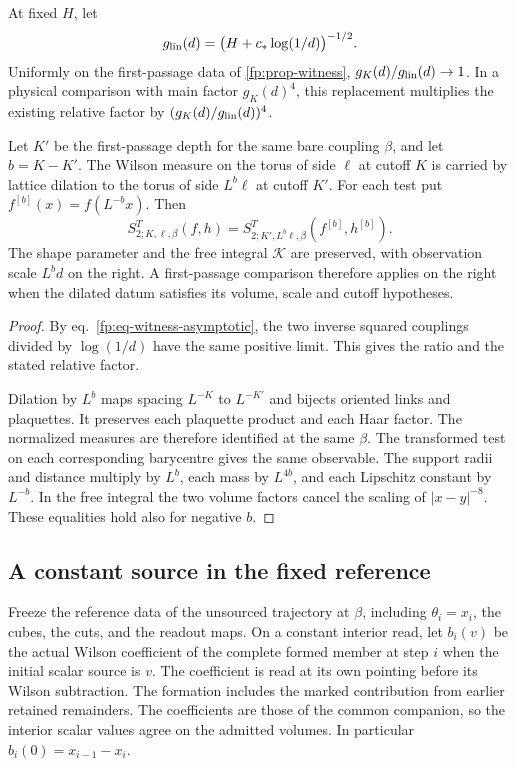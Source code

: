 \documentclass[11pt,letterpaper,reqno]{amsart}
\makeatletter
\numberwithin{equation}{section}
\renewcommand{\eqref}[1]{\textup{eq.~\ref{#1}}}
\theoremstyle{definition}
\newcommand{\ms@majorstart}{%
  \pushQED{\qed}\renewcommand{\qedsymbol}{$\blacksquare\square$}}
\newenvironment{corollary}[1][]{\ms@majorstart\ms@corollary[#1]}
  {\popQED\endms@corollary}
\theoremstyle{remark}
\makeatother
\begin{document}
\begin{corollary}[One-loop comparison and dilation]
\label{fp:cor-witness-variants}
At fixed \(H\), let
\[
 g_{\rm lin}(d)=\bigl(H+c_*\log(1/d)\bigr)^{-1/2}.
\]
Uniformly on the first-passage data of \cref{fp:prop-witness},
\(g_K(d)/g_{\rm lin}(d)\to1\).
In a physical comparison with main factor \(g_K(d)^4\), this
replacement multiplies the existing relative factor by
\((g_K(d)/g_{\rm lin}(d))^4\).

Let \(K'\) be the first-passage depth for the same bare coupling
\(\beta\), and let \(b=K-K'\). The Wilson measure on the torus
of side \(\ell\) at cutoff \(K\) is carried by lattice dilation
to the torus of side \(L^b\ell\) at cutoff \(K'\).
For each test put \(f^{[b]}(x)=f(L^{-b}x)\). Then
\[
 S^T_{2;K,\ell,\beta}(f,h)=
 S^T_{2;K',L^b\ell,\beta}(f^{[b]},h^{[b]}).
\]
The shape parameter and the free integral \(\mathcal K\) are
preserved, with observation scale \(L^b d\) on the right.
A first-passage comparison therefore applies on the right
when the dilated datum satisfies its volume, scale and cutoff
hypotheses.
\end{corollary}
\begin{proof}
By \eqref{fp:eq-witness-asymptotic}, the two inverse squared
couplings divided by \(\log(1/d)\) have the same positive limit.
This gives the ratio and the stated relative factor.

Dilation by \(L^b\) maps spacing \(L^{-K}\) to \(L^{-K'}\) and
bijects oriented links and plaquettes. It preserves each
plaquette product and each Haar factor. The normalized
measures are therefore identified at the same \(\beta\).
The transformed test on each corresponding barycentre gives
the same observable. The support radii and distance multiply
by \(L^b\), each mass by \(L^{4b}\), and each Lipschitz constant
by \(L^{-b}\). In the free integral the two volume factors
cancel the scaling of \(|x-y|^{-8}\). These equalities hold
also for negative \(b\).
\end{proof}

\subsection{A constant source in the fixed reference}

Freeze the reference data of the unsourced trajectory at \(\beta\),
including \(\theta_i=x_i\), the cubes, the cuts, and the readout
maps. On a constant interior read, let \(b_i(v)\) be the actual
Wilson coefficient of the complete formed member at step \(i\)
when the initial scalar source is \(v\). The coefficient is read
at its own pointing before its Wilson subtraction. The formation
includes the marked contribution from earlier retained remainders.
The coefficients are those of the common companion, so the
interior scalar values agree on the admitted volumes.
In particular \(b_i(0)=x_{i-1}-x_i\).
\end{document}
